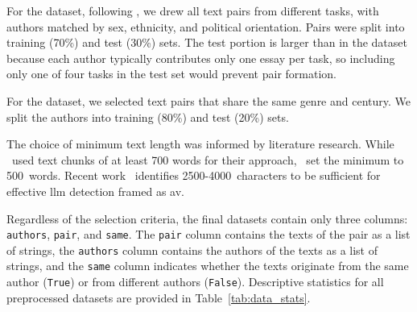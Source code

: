 For the \dataStudent{} dataset, following \citet{koppel_determining_2014}, we drew all text pairs from different tasks, with authors matched by sex, ethnicity, and political orientation. Pairs were split into training (70\%) and test (30\%) sets.
The test portion is larger than in the \dataBlog{} dataset because each author typically contributes only one essay per task, so including only one of four tasks in the test set would prevent pair formation.

For the \dataGutenberg{} dataset, we selected text pairs that share the same genre and century.
We split the authors into training (80\%) and test (20\%) sets.

The choice of minimum text length was informed by literature research.
While \citet{bevendorff_generalizing_2019}\ used text chunks of at least 700 words for their \unmasking{} approach, \citet{koppel_authorship_2004}\ set the minimum to \num{500}~words.
Recent work~\citep{llm_detection_av_2025} identifies \num{2500}-\num{4000}~characters to be sufficient for effective \ac{llm} detection framed as \ac{av}.

Regardless of the selection criteria, the final datasets contain only three columns: \texttt{authors}, \texttt{pair}, and \texttt{same}.
The \texttt{pair} column contains the texts of the pair as a list of strings,
the \texttt{authors} column contains the authors of the texts as a list of strings,
and the \texttt{same} column indicates whether the texts originate from the same author (\texttt{True}) or from different authors (\texttt{False}).
Descriptive statistics for all preprocessed datasets are provided in Table~\ref{tab:data_stats}.



